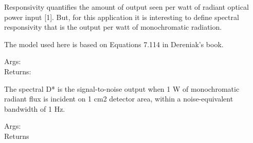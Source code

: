 \documentclass[a4paper,10pt,english]{sphinxmanual}
\begin{document}
\begin{fulllineitems}
\label{rydetector:pyradi.rydetector.Responsivity}
Responsivity quantifies the amount of output seen per watt of radiant
optical power input {[}1{]}. But, for this application it is interesting to
define spectral responsivity that is the output per watt of monochromatic
radiation.

The model used here is based on Equations 7.114 in Dereniak's book.
\begin{description}
\item[{Args:}] \leavevmode
{}

\item[{Returns:}] \leavevmode
{}

\end{description}

\end{fulllineitems}


\begin{fulllineitems}
\label{rydetector:pyradi.rydetector.DStar}
The spectral D* is the signal-to-noise output when 1 W of monochromatic
radiant flux is incident on 1 cm2 detector area, within a
noise-equivalent bandwidth of 1 Hz.
\begin{description}
\item[{Args:}] \leavevmode
{}

\item[{Returns}] \leavevmode
{}

\end{description}

\end{fulllineitems}
\end{document}
